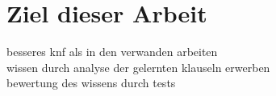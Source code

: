 \section{Ziel dieser Arbeit}

besseres knf als in den verwanden arbeiten\\
wissen durch analyse der gelernten klauseln erwerben\\
bewertung des wissens durch tests

